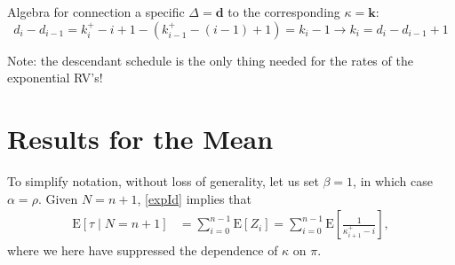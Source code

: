 \documentclass[stsy,dblanonrev]{amers/INFORMS-STSY-Template-26-02-2026/informs4}
\newcommand{\E}[1]{{\mathrm{E}\left[#1\right]}}
\begin{document}
Algebra for connection a specific $\Delta = \mathbf{d}$ to the corresponding $\kappa = \mathbf{k}$:
$$
d_{i} - d_{i-1} = k_i^+ - i + 1 - (k_{i-1}^+ - (i - 1) + 1) = k_i - 1 \longrightarrow k_i = d_{i} - d_{i-1} + 1
$$

Note: the descendant schedule is the only thing needed for the rates of the exponential RV's!

\section{Results for the Mean}



To simplify notation, without loss of generality, let us set $\beta = 1$, in which case $\alpha = \rho$. Given $N = n+1$, \eqref{expId}  implies that
\begin{align*}
\E{\tau \mid N = n + 1}
&=
\sum_{i=0}^{n-1}\E{Z_i}
=
\sum_{i=0}^{n-1}\E{\frac{1}{\kappa_{i+1}^+ - i}}
,
\end{align*}
where we here have suppressed the dependence of $\kappa$ on $\pi$. 
\end{document}
